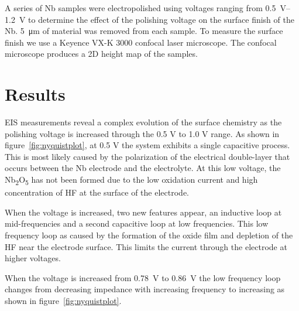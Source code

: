 \documentclass{revtex4-2}
\begin{document}
A series of Nb samples were electropolished using voltages ranging from \qtyrange{0.5}{1.2}{\volt} to determine the effect of the polishing voltage on the surface finish of the Nb. \qty{5}{\micro\meter} of material was removed from each sample. To measure the surface finish we use a  Keyence VX-K 3000 confocal laser microscope. The confocal microscope produces a 2D height map of the samples.



\section{Results}
\label{sec:org4a45003}

EIS measurements reveal a complex evolution of the surface chemistry as the polishing voltage is increased through the 0.5 V to 1.0 V range. As shown in figure~\ref{fig:nyquistplot}, at 0.5 V the system exhibits a single capacitive process. This is most likely caused by the polarization of the electrical double-layer that occurs between the Nb electrode and the electrolyte. At this low voltage, the Nb\textsubscript{2}O\textsubscript{5} has not been formed due to the low oxidation current and high concentration of HF at the surface of the electrode.

When the voltage is increased, two new features appear, an inductive loop at mid-frequencies and a second capacitive loop at low frequencies. This low frequency loop as caused by the formation of the oxide film and depletion of the HF near the electrode surface. This limits the current through the electrode at higher voltages. 

When the voltage is increased from \qty{0.78}{\volt} to \qty{0.86}{\volt} the low frequency loop changes from decreasing impedance with increasing frequency to increasing as shown in figure~\ref{fig:nyquistplot}.
\end{document}
